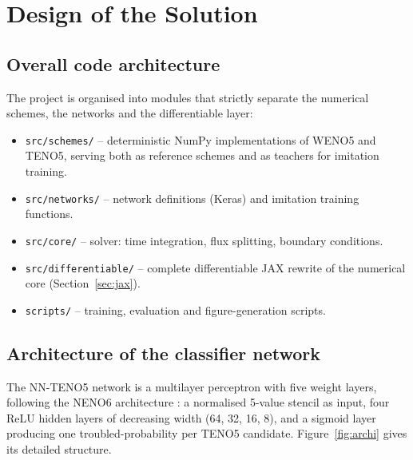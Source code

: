 \documentclass[12pt,a4paper,oneside]{report}
\begin{document}
\chapter{Design of the Solution}
\label{chap:design}

\section{Overall code architecture}

The project is organised into modules that strictly separate the numerical
schemes, the networks and the differentiable layer:

\begin{itemize}
  \item \texttt{src/schemes/} -- deterministic NumPy implementations of WENO5
  and TENO5, serving both as reference schemes and as teachers for imitation
  training.
  \item \texttt{src/networks/} -- network definitions (Keras) and imitation
  training functions.
  \item \texttt{src/core/} -- solver: time integration, flux splitting,
  boundary conditions.
  \item \texttt{src/differentiable/} -- complete differentiable JAX rewrite of
  the numerical core (Section~\ref{sec:jax}).
  \item \texttt{scripts/} -- training, evaluation and figure-generation
  scripts.
\end{itemize}

\section{Architecture of the classifier network}
\label{sec:archi-network}

The NN-TENO5 network is a multilayer perceptron with five weight layers,
following the NENO6 architecture \cite{li2022}: a normalised 5-value stencil as
input, four ReLU hidden layers of decreasing width (64, 32, 16, 8), and a
sigmoid layer producing one troubled-probability per TENO5 candidate.
Figure~\ref{fig:archi} gives its detailed structure.
\end{document}
